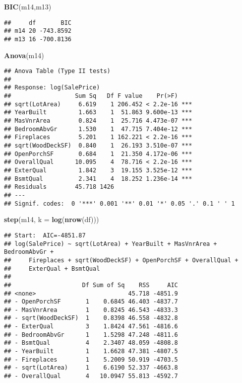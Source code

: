 \documentclass[
]{article}
\newenvironment{Shaded}{\begin{snugshade}}{\end{snugshade}}
\newcommand{\AttributeTok}[1]{\textcolor[rgb]{0.13,0.29,0.53}{#1}}
\newcommand{\FunctionTok}[1]{\textcolor[rgb]{0.13,0.29,0.53}{\textbf{#1}}}
\newcommand{\NormalTok}[1]{#1}
\begin{document}
\begin{Shaded}
\begin{Highlighting}[]
\FunctionTok{BIC}\NormalTok{(m14,m13)}
\end{Highlighting}
\end{Shaded}

\begin{verbatim}
##     df       BIC
## m14 20 -743.8592
## m13 16 -700.8136
\end{verbatim}

\begin{Shaded}
\begin{Highlighting}[]
\FunctionTok{Anova}\NormalTok{(m14)}
\end{Highlighting}
\end{Shaded}

\begin{verbatim}
## Anova Table (Type II tests)
## 
## Response: log(SalePrice)
##                  Sum Sq   Df F value    Pr(>F)    
## sqrt(LotArea)     6.619    1 206.452 < 2.2e-16 ***
## YearBuilt         1.663    1  51.863 9.600e-13 ***
## MasVnrArea        0.824    1  25.716 4.473e-07 ***
## BedroomAbvGr      1.530    1  47.715 7.404e-12 ***
## Fireplaces        5.201    1 162.221 < 2.2e-16 ***
## sqrt(WoodDeckSF)  0.840    1  26.193 3.510e-07 ***
## OpenPorchSF       0.684    1  21.350 4.172e-06 ***
## OverallQual      10.095    4  78.716 < 2.2e-16 ***
## ExterQual         1.842    3  19.155 3.525e-12 ***
## BsmtQual          2.341    4  18.252 1.236e-14 ***
## Residuals        45.718 1426                      
## ---
## Signif. codes:  0 '***' 0.001 '**' 0.01 '*' 0.05 '.' 0.1 ' ' 1
\end{verbatim}

\begin{Shaded}
\begin{Highlighting}[]
\FunctionTok{step}\NormalTok{(m14, }\AttributeTok{k =} \FunctionTok{log}\NormalTok{(}\FunctionTok{nrow}\NormalTok{(df)))}
\end{Highlighting}
\end{Shaded}

\begin{verbatim}
## Start:  AIC=-4851.87
## log(SalePrice) ~ sqrt(LotArea) + YearBuilt + MasVnrArea + BedroomAbvGr + 
##     Fireplaces + sqrt(WoodDeckSF) + OpenPorchSF + OverallQual + 
##     ExterQual + BsmtQual
## 
##                    Df Sum of Sq    RSS     AIC
## <none>                          45.718 -4851.9
## - OpenPorchSF       1    0.6845 46.403 -4837.7
## - MasVnrArea        1    0.8245 46.543 -4833.3
## - sqrt(WoodDeckSF)  1    0.8398 46.558 -4832.8
## - ExterQual         3    1.8424 47.561 -4816.6
## - BedroomAbvGr      1    1.5298 47.248 -4811.6
## - BsmtQual          4    2.3407 48.059 -4808.8
## - YearBuilt         1    1.6628 47.381 -4807.5
## - Fireplaces        1    5.2009 50.919 -4703.5
## - sqrt(LotArea)     1    6.6190 52.337 -4663.8
## - OverallQual       4   10.0947 55.813 -4592.7
\end{verbatim}
\end{document}
